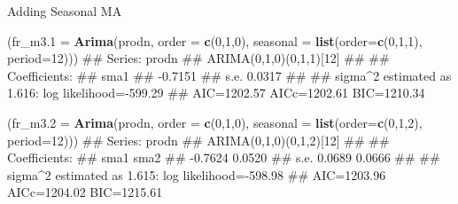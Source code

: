 \documentclass[11pt,ignorenonframetext,]{beamer}
\newenvironment{Shaded}{}{}
\newcommand{\KeywordTok}[1]{\textcolor[rgb]{0.00,0.44,0.13}{\textbf{#1}}}
\newcommand{\DataTypeTok}[1]{\textcolor[rgb]{0.56,0.13,0.00}{#1}}
\newcommand{\DecValTok}[1]{\textcolor[rgb]{0.25,0.63,0.44}{#1}}
\newcommand{\NormalTok}[1]{#1}
\let\oldShaded\Shaded
\let\endoldShaded\endShaded
\renewenvironment{Shaded}{\footnotesize\begin{spacing}{0.9}\oldShaded}{\endoldShaded\end{spacing}}
\let\oldverbatim\verbatim
\let\endoldverbatim\endverbatim
\newcommand{\scriptoutput}{
  \renewenvironment{Shaded}{\scriptsize\begin{spacing}{0.9}\oldShaded}{\endoldShaded\end{spacing}}
  \renewenvironment{verbatim}{\scriptsize\begin{spacing}{0.9}\oldverbatim}{\endoldverbatim\end{spacing}}
}
\begin{document}
\begin{frame}[fragile]{Adding Seasonal MA}

\scriptoutput

\begin{Shaded}
\begin{Highlighting}[]
\NormalTok{(}\DataTypeTok{fr_m3.1 =} \KeywordTok{Arima}\NormalTok{(prodn, }\DataTypeTok{order =} \KeywordTok{c}\NormalTok{(}\DecValTok{0}\NormalTok{,}\DecValTok{1}\NormalTok{,}\DecValTok{0}\NormalTok{), }
            \DataTypeTok{seasonal =} \KeywordTok{list}\NormalTok{(}\DataTypeTok{order=}\KeywordTok{c}\NormalTok{(}\DecValTok{0}\NormalTok{,}\DecValTok{1}\NormalTok{,}\DecValTok{1}\NormalTok{), }\DataTypeTok{period=}\DecValTok{12}\NormalTok{)))}
\NormalTok{## Series: prodn }
\NormalTok{## ARIMA(0,1,0)(0,1,1)[12]                    }
\NormalTok{## }
\NormalTok{## Coefficients:}
\NormalTok{##          sma1}
\NormalTok{##       -0.7151}
\NormalTok{## s.e.   0.0317}
\NormalTok{## }
\NormalTok{## sigma^2 estimated as 1.616:  log likelihood=-599.29}
\NormalTok{## AIC=1202.57   AICc=1202.61   BIC=1210.34}
\end{Highlighting}
\end{Shaded}

\begin{Shaded}
\begin{Highlighting}[]
\NormalTok{(}\DataTypeTok{fr_m3.2 =} \KeywordTok{Arima}\NormalTok{(prodn, }\DataTypeTok{order =} \KeywordTok{c}\NormalTok{(}\DecValTok{0}\NormalTok{,}\DecValTok{1}\NormalTok{,}\DecValTok{0}\NormalTok{), }
            \DataTypeTok{seasonal =} \KeywordTok{list}\NormalTok{(}\DataTypeTok{order=}\KeywordTok{c}\NormalTok{(}\DecValTok{0}\NormalTok{,}\DecValTok{1}\NormalTok{,}\DecValTok{2}\NormalTok{), }\DataTypeTok{period=}\DecValTok{12}\NormalTok{)))}
\NormalTok{## Series: prodn }
\NormalTok{## ARIMA(0,1,0)(0,1,2)[12]                    }
\NormalTok{## }
\NormalTok{## Coefficients:}
\NormalTok{##          sma1    sma2}
\NormalTok{##       -0.7624  0.0520}
\NormalTok{## s.e.   0.0689  0.0666}
\NormalTok{## }
\NormalTok{## sigma^2 estimated as 1.615:  log likelihood=-598.98}
\NormalTok{## AIC=1203.96   AICc=1204.02   BIC=1215.61}
\end{Highlighting}
\end{Shaded}

\end{frame}
\end{document}

